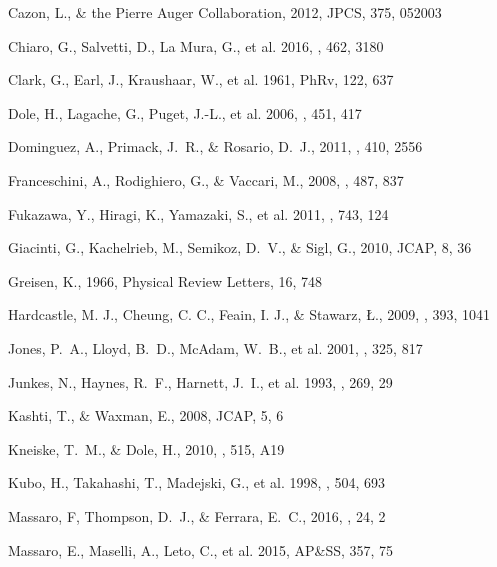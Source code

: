 \documentclass{aastex6}
\begin{document}
\begin{thebibliography}{99}
 Cazon, L., \& the Pierre Auger Collaboration, 2012, JPCS, 375, 052003

 Chiaro, G., Salvetti, D., La Mura, G., et al. 2016, \mnras, 462, 3180 

 Clark, G., Earl, J., Kraushaar, W., et al. 1961, PhRv, 122, 637

 Dole, H., Lagache, G., Puget, J.-L., et al. 2006, \aap, 451, 417

 Dominguez, A., Primack, J.~R., \& Rosario, D.~J., 2011, \mnras, 410, 2556

 Franceschini, A., Rodighiero, G., \& Vaccari, M., 2008, \aap, 487, 837

 Fukazawa, Y., Hiragi, K., Yamazaki, S., et al. 2011, \apj, 743, 124

 Giacinti, G., Kachelrieb, M., Semikoz, D.~V., \& Sigl, G., 2010, JCAP, 8, 36

 Greisen, K., 1966, Physical Review Letters, 16, 748

 Hardcastle, M. J., Cheung, C. C., Feain, I. J., \& Stawarz, \L., 2009, \mnras, 393, 1041

 Jones, P.~A., Lloyd, B.~D., McAdam, W.~B., et al. 2001, \mnras, 325, 817

 Junkes, N., Haynes, R.~F., Harnett, J.~I., et al. 1993, \aap, 269, 29

 Kashti, T., \& Waxman, E., 2008, JCAP, 5, 6


 Kneiske, T.~M., \& Dole, H., 2010, \aap, 515, A19 

 Kubo, H., Takahashi, T., Madejski, G., et al. 1998, \apj, 504, 693

 Massaro, F, Thompson, D.~J., \& Ferrara, E.~C., 2016, \aapr, 24, 2 

 Massaro, E., Maselli, A., Leto, C., et al. 2015, AP\&SS, 357, 75


\end{thebibliography}
\end{document}
